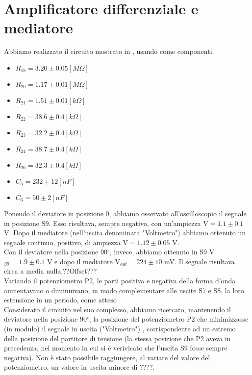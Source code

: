 \section{Amplificatore differenziale e mediatore}
Abbiamo realizzato il circuito mostrato in , usando come componenti:
\begin{itemize}
\item $R_{18}=3.20 \pm 0.05[M\Omega]$
\item $R_{20}=1.17 \pm 0.01[M\Omega]$
\item $R_{21}=1.51 \pm 0.01[k\Omega]$
\item $R_{22}=38.6 \pm 0.4[k\Omega]$
\item $R_{23}=32.2 \pm 0.4[k\Omega]$
\item $R_{24}=38.7 \pm 0.4[k\Omega]$
\item $R_{26}=32.3 \pm 0.4[k\Omega]$
\item $C_5=232 \pm 12[nF]$
\item $C_6=50 \pm 2[nF]$
\end{itemize}
Ponendo il deviatore in posizione 0, abbiamo osservato all'oscilloscopio il segnale in posizione S9. Esso risultava, sempre negativo, con un'ampiezza V$ = 1.1 \pm 0.1$ V. Dopo il mediatore (nell'uscita denominata "Voltmetro") abbiamo ottenuto un segnale continuo, positivo, di ampiezza V$ = 1.12 \pm 0.05$ V.\\
Con il deviatore nella posizione 90$^\circ$, invece, abbiamo ottenuto in S9 V$_{S9} = 1.9 \pm 0.1$ V e dopo il mediatore V$_{out} = 224 \pm 10$ mV. Il segnale risultava circa a media nulla.??Offset???\\
 Variando il potenziometro P2, le parti positiva e negativa della forma d'onda aumentavano o diminuivano, in modo complementare alle uscite S7 e S8, la loro estensione in un periodo, come atteso\\
Considerato il circuito nel suo complesso, abbiamo ricercato, mantenendo il deviatore nella posizione 90$^\circ$, la posizione del potenziometro P2 che minimizzasse (in modulo) il segnale in uscita ("Voltmetro") , corrispondente ad un estremo della posizione del partitore di tensione (la stessa posizione che P2 aveva in precedenza, nel momento in cui si è verivicato che l'uscita S9 fosse sempre negativa). Non è stato possibile raggiungere, al variare del valore del potenziometro, un valore in uscita minore di ????. 

